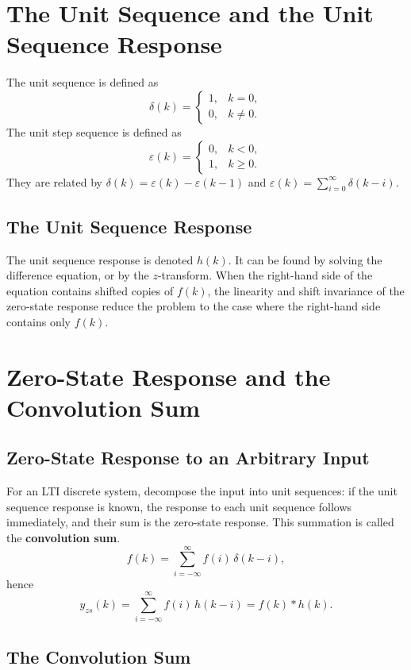 \section{The Unit Sequence and the Unit Sequence Response}

The unit sequence is defined as
\[
    \delta(k)=
    \begin{cases}
        1, & k=0,\\
        0, & k\neq 0 .
    \end{cases}
\]
The unit step sequence is defined as
\[
    \varepsilon(k)=
    \begin{cases}
        0, & k<0,\\
        1, & k\ge 0 .
    \end{cases}
\]
They are related by $\delta(k)=\varepsilon(k)-\varepsilon(k-1)$ and
$\varepsilon(k)=\sum_{i=0}^{\infty}\delta(k-i)$.

\subsection{The Unit Sequence Response}

The unit sequence response is denoted $h(k)$. It can be found by solving the
difference equation, or by the $z$-transform. When the right-hand side of the
equation contains shifted copies of $f(k)$, the linearity and shift invariance
of the zero-state response reduce the problem to the case where the
right-hand side contains only $f(k)$.

\section{Zero-State Response and the Convolution Sum}

\subsection{Zero-State Response to an Arbitrary Input}

For an LTI discrete system, decompose the input into unit sequences: if the
unit sequence response is known, the response to each unit sequence follows
immediately, and their sum is the zero-state response. This summation is
called the \textbf{convolution sum}.
\[
    f(k)=\sum_{i=-\infty}^{\infty}f(i)\,\delta(k-i),
\]
hence
\[
    y_{zs}(k)=\sum_{i=-\infty}^{\infty}f(i)\,h(k-i)=f(k)*h(k).
\]

\subsection{The Convolution Sum}

